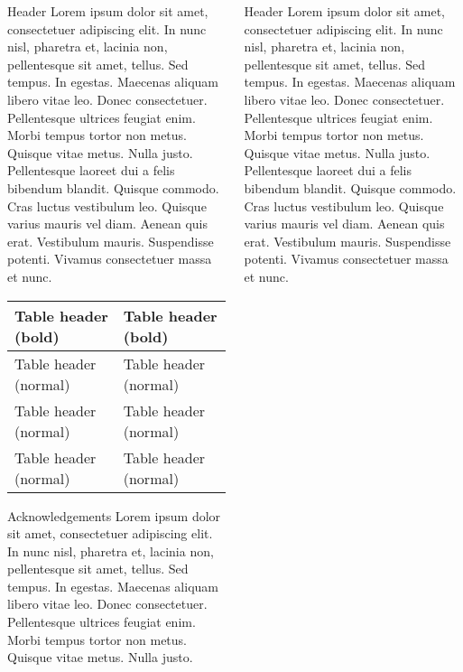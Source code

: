 \documentclass[xcolor={table}]{beamer}
\begin{document}
\begin{frame}[fragile=singleslide,t]
\begin{columns}[onlytextwidth,T]
\begin{column}{.47\textwidth}
\begin{block}{Header}
Lorem ipsum dolor sit amet, consectetuer adipiscing elit. In nunc nisl, pharetra et, lacinia non, pellentesque sit amet, tellus. Sed tempus. In egestas. Maecenas aliquam libero vitae leo. Donec consectetuer. Pellentesque ultrices feugiat enim. Morbi tempus tortor non metus. Quisque vitae metus. Nulla justo. Pellentesque laoreet dui a felis bibendum blandit. Quisque commodo. Cras luctus vestibulum leo. Quisque varius mauris vel diam.  Aenean quis erat. Vestibulum mauris. Suspendisse potenti. Vivamus consectetuer massa et nunc.
\end{block}

\begin{table}
\begin{tabularx}{\linewidth}{  X  X  }
\toprule
\textbf{Table header (bold)} & \textbf{Table header (bold)} \\
\midrule
Table header (normal) & Table header (normal) \\
\midrule
Table header (normal) & Table header (normal) \\
\midrule
Table header (normal) & Table header (normal) \\
\bottomrule
\end{tabularx}
\end{table}

\begin{block}{Acknowledgements}
Lorem ipsum dolor sit amet, consectetuer adipiscing elit. In nunc nisl, pharetra et, lacinia non, pellentesque sit amet, tellus. Sed tempus. In egestas. Maecenas aliquam libero vitae leo. Donec consectetuer. Pellentesque ultrices feugiat enim. Morbi tempus tortor non metus. Quisque vitae metus. Nulla justo.
\end{block}

\end{column}


\begin{column}{.47\textwidth}

\begin{block}{Header}
Lorem ipsum dolor sit amet, consectetuer adipiscing elit. In nunc nisl, pharetra et, lacinia non, pellentesque sit amet, tellus. Sed tempus. In egestas. Maecenas aliquam libero vitae leo. Donec consectetuer. Pellentesque ultrices feugiat enim. Morbi tempus tortor non metus. Quisque vitae metus. Nulla justo. Pellentesque laoreet dui a felis bibendum blandit. Quisque commodo.
Cras luctus vestibulum leo. Quisque varius mauris vel diam. Aenean quis erat. Vestibulum mauris. Suspendisse potenti. Vivamus consectetuer massa et nunc.
\end{block}


\end{column}
\end{columns}
\end{frame}
\end{document}

